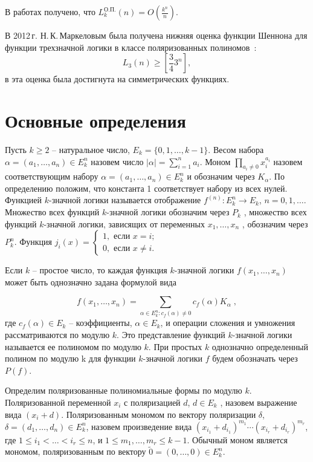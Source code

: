 \documentclass[bibliography=totoc, a4paper, 14pt]{extarticle}
\let\stdsection\section
\renewcommand\section{\newpage\stdsection}
\begin{document}
В работах \cite{sd08, bs14} получено, что
$L^{\text{О.П.}}_k(n) = O(\frac{k ^ n}{n})$.

В 2012\,г. Н.\,К.\,Маркеловым была получена нижняя оценка функции Шеннона для функции трехзначной логики в классе
поляризованных полиномов~\cite{mn12}:
$$
L_3(n) \geqslant \left[\frac{3}{4}3^n\right],
$$
в \cite{ss15} эта оценка была достигнута на симметрических функциях.

\section{Основные определения}

Пусть $k \geqslant 2$ -- натуральное число, $E_k = \{0, 1, \dots, k - 1\}$. Весом набора
$\alpha = (a_1, \dots, a_n ) \in E_k^n$ назовем число $|\alpha| = \sum\limits_{i=1}^n a_i$.
Моном $\prod\limits_{a_i\neq0}x_i^{a_i}$ назовем соответствующим набору $\alpha =
(a_1, \dots, a_n ) \in E_k^n$ и обозначим через $K_{\alpha}$. По определению положим, что константа
1 соответствует набору из всех нулей. Функцией $k$\nobreakdash-значной логики называется
отображение $f^{(n)} : E_k^n \rightarrow E_k$, $n = 0, 1, \dots$.
Множество всех функций $k$-значной логики обозначим через $P_k$ , множество всех функций
$k$-значной логики, зависящих от переменных $x_1, \dots, x_n$ , обозначим через $P_k^n$.
Функция $j_i(x) = \begin{cases} 1, \text{ если } x = i; \\
                                0, \text{ если } x \neq i. \end{cases}$

Если $k$ -- простое число, то каждая функция $k$\nobreakdash-значной логики $f(x_1 , \dots , x_n)$
может быть однозначно задана формулой вида

$$ f(x_1, \dots, x_n) = \sum_{\alpha \in E_k^n:c_f(\alpha) \neq 0}c_f(\alpha)K_\alpha \; ,$$
где $c_f(\alpha) \in E_k$ -- коэффициенты, $\alpha \in E_k$, и операции сложения и умножения
рассматриваются по модулю $k$. Это представление функций $k$\nobreakdash-значной
логики называется ее полиномом по модулю $k$. При простых $k$ однозначно
определенный полином по модулю k для функции $k$\nobreakdash-значной логики $f$ будем
обозначать через $P(f)$.

Определим поляризованные полиномиальные формы по модулю $k$. Поляризованной переменной $x_i$ с поляризацией $d$,
$d \in E_k$ , назовем выражение вида $(x_i + d)$. Поляризованным мономом по вектору поляризации $\delta$,
$\delta = (d_1, \dots, d_n) \in E_k^n$, назовем произведение вида $(x_{i_1} + d_{i_1} )^{m_1}\cdots(x_{i_r} + d_{i_r})^{m_r}$,
где $1 \leqslant i_1 < \ldots < i_r \leqslant n$, и $1 \leqslant m_1 , \dots , m_r \leqslant k - 1$. Обычный моном является
мономом, поляризованным по вектору $\tilde{0} = (0, \dots, 0) \in E_k^n $.
\end{document}
